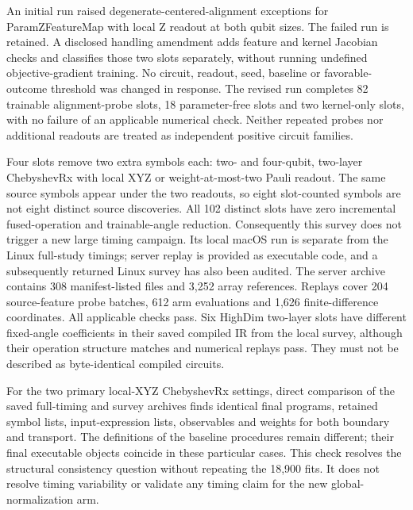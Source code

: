 An initial run raised degenerate-centered-alignment exceptions for
ParamZFeatureMap with local Z readout at both qubit sizes. The failed
run is retained. A disclosed handling amendment adds feature and kernel
Jacobian checks and classifies those two slots separately, without
running undefined objective-gradient training. No circuit, readout,
seed, baseline or favorable-outcome threshold was changed in response.
The revised run completes 82 trainable alignment-probe slots, 18
parameter-free slots and two kernel-only slots, with no failure of
an applicable numerical check. Neither repeated probes nor additional
readouts are treated as independent positive circuit families.

Four slots remove two extra symbols each: two- and four-qubit,
two-layer ChebyshevRx with local XYZ or weight-at-most-two Pauli
readout. The same source symbols appear under the two readouts, so
eight slot-counted symbols are not eight distinct source discoveries.
All 102 distinct slots have zero incremental fused-operation and
trainable-angle reduction. Consequently this survey does not trigger
a new large timing campaign. Its local macOS run is separate from the
Linux full-study timings; server replay is provided as executable code,
and a subsequently returned Linux survey has also been audited.
The server archive contains 308 manifest-listed files and 3,252 array
references. Replays cover 204 source-feature probe batches, 612 arm
evaluations and 1,626 finite-difference coordinates. All applicable
checks pass. Six HighDim two-layer slots have different fixed-angle
coefficients in their saved compiled IR from the local survey, although
their operation structure matches and numerical replays pass. They
must not be described as byte-identical compiled circuits.

For the two primary local-XYZ ChebyshevRx settings, direct comparison
of the saved full-timing and survey archives finds identical final
programs, retained symbol lists, input-expression lists, observables
and weights for both boundary and transport. The definitions of the
baseline procedures remain different; their final executable objects
coincide in these particular cases. This check resolves the structural
consistency question without repeating the 18,900 fits. It does not
resolve timing variability or validate any timing claim for the new
global-normalization arm.

